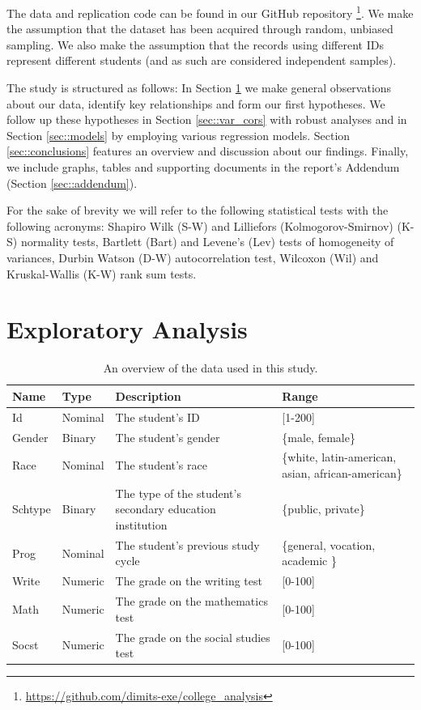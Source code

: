 \documentclass[10pt, a4paper]{article}
\begin{document}
	The data and replication code can be found in our GitHub repository \footnote{\url{https://github.com/dimits-exe/college_analysis}}. We make the assumption that the dataset has been acquired through random, unbiased sampling. We also make the assumption that the records using different IDs represent different students (and as such are considered independent samples).
	
	The study is structured as follows: In Section \ref{sec::exploratory} we make general observations about our data, identify key relationships and form our first hypotheses. We follow up these hypotheses in Section \ref{sec::var_cors} with robust analyses and in Section \ref{sec::models} by employing various regression models. Section \ref{sec::conclusions} features an overview and discussion about our findings. Finally, we include graphs, tables and supporting documents in the report's Addendum (Section \ref{sec::addendum}).
	
	For the sake of brevity we will refer to the following statistical tests with the following acronyms: Shapiro Wilk (S-W) and Lilliefors (Kolmogorov-Smirnov) (K-S) normality tests, Bartlett (Bart) and Levene's (Lev) tests of homogeneity of variances, Durbin Watson (D-W) autocorrelation test, Wilcoxon (Wil) and Kruskal-Wallis (K-W) rank sum tests.
	
	
	
	\section{Exploratory Analysis}
	\label{sec::exploratory}
	
	\begin{table}
		\centering
		\begin{tabular}
			{ |p{1cm} p{1cm} p{5cm} p{3cm}| }
			\hline
			\textbf{Name} & \textbf{Type} & \textbf{Description} & \textbf{Range}\\
			\hline
			Id  & Nominal & The student's ID & [1-200] \\
			Gender  & Binary & The student's gender & \{male, female\} \\
			Race  & Nominal & The student's race & \{white, latin-american, asian, african-american\} \\
			Schtype  & Binary & The type of the student's secondary education institution & \{public, private\} \\
			Prog  & Nominal & The student's previous study cycle  & \{general, vocation, academic \} \\
			Write  & Numeric & The grade on the writing test  & [0-100] \\
			Math  & Numeric & The grade on the mathematics test  & [0-100] \\
			Socst  & Numeric & The grade on the social studies test & [0-100] \\
			\hline
		\end{tabular}
		\caption{An overview of the data used in this study.}
		\label{tab::dataset}
	\end{table}
	
\end{document}
